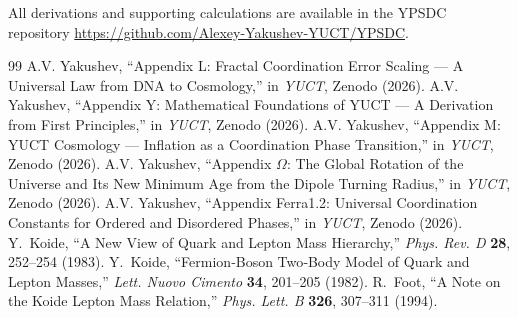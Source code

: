 \documentclass[12pt,a4paper]{article}
\begin{document}
	All derivations and supporting calculations are available in the YPSDC repository \url{https://github.com/Alexey-Yakushev-YUCT/YPSDC}.
	
	\begin{thebibliography}{99}
		 A.V. Yakushev, ``Appendix L: Fractal Coordination Error Scaling — A Universal Law from DNA to Cosmology,'' in \emph{YUCT}, Zenodo (2026).
		 A.V. Yakushev, ``Appendix Y: Mathematical Foundations of YUCT — A Derivation from First Principles,'' in \emph{YUCT}, Zenodo (2026).
		 A.V. Yakushev, ``Appendix M: YUCT Cosmology — Inflation as a Coordination Phase Transition,'' in \emph{YUCT}, Zenodo (2026).
		 A.V. Yakushev, ``Appendix $\Omega$: The Global Rotation of the Universe and Its New Minimum Age from the Dipole Turning Radius,'' in \emph{YUCT}, Zenodo (2026).
		 A.V. Yakushev, ``Appendix Ferra1.2: Universal Coordination Constants for Ordered and Disordered Phases,'' in \emph{YUCT}, Zenodo (2026).
		 Y.~Koide, ``A New View of Quark and Lepton Mass Hierarchy,''
		\emph{Phys. Rev. D} \textbf{28}, 252--254 (1983).
		 Y.~Koide, ``Fermion‑Boson Two‑Body Model of Quark and Lepton Masses,''
		\emph{Lett. Nuovo Cimento} \textbf{34}, 201--205 (1982).
		 R.~Foot, ``A Note on the Koide Lepton Mass Relation,''
		\emph{Phys. Lett. B} \textbf{326}, 307--311 (1994).
	\end{thebibliography}
	
\end{document}

